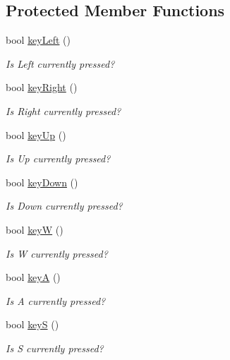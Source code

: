 \subsection*{Protected Member Functions}
\begin{DoxyCompactItemize}
\item 
bool \hyperlink{classbridges_1_1_non_blocking_game_a33993f8ba1447230f6d6a98972aa05ee}{key\+Left} ()
\begin{DoxyCompactList}\small\item\em Is Left currently pressed? \end{DoxyCompactList}\item 
bool \hyperlink{classbridges_1_1_non_blocking_game_a04e19e3765a557a533419c72ca3ad04d}{key\+Right} ()
\begin{DoxyCompactList}\small\item\em Is Right currently pressed? \end{DoxyCompactList}\item 
bool \hyperlink{classbridges_1_1_non_blocking_game_ad86357fce301559a5e29691045ea243e}{key\+Up} ()
\begin{DoxyCompactList}\small\item\em Is Up currently pressed? \end{DoxyCompactList}\item 
bool \hyperlink{classbridges_1_1_non_blocking_game_aaa71b00db50b075674edeca08651d740}{key\+Down} ()
\begin{DoxyCompactList}\small\item\em Is Down currently pressed? \end{DoxyCompactList}\item 
bool \hyperlink{classbridges_1_1_non_blocking_game_a4d5b1c1634e450eb502e8690659e500d}{keyW} ()
\begin{DoxyCompactList}\small\item\em Is W currently pressed? \end{DoxyCompactList}\item 
bool \hyperlink{classbridges_1_1_non_blocking_game_a57b16f580dceb6a75aee1cdd49225aa0}{keyA} ()
\begin{DoxyCompactList}\small\item\em Is A currently pressed? \end{DoxyCompactList}\item 
bool \hyperlink{classbridges_1_1_non_blocking_game_a82e870ad44bd9b0c9c84b788ace9b7be}{keyS} ()
\begin{DoxyCompactList}\small\item\em Is S currently pressed? \end{DoxyCompactList}\item 

\end{DoxyCompactItemize}

